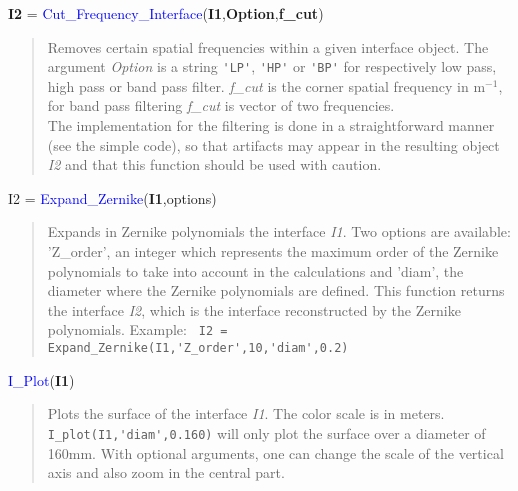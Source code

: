 \noindent \textbf{I2} = \textcolor{blue}{Cut\_Frequency\_Interface}(\textbf{I1},\textbf{Option},\textbf{f\_cut})
\vspace*{-0.2cm}
\begin{quote}
Removes certain spatial frequencies within a given interface object. The argument \textsl{Option} is a string \verb?'LP'?, \verb?'HP'? or \verb?'BP'? for respectively low pass, high pass or band pass filter. \textsl{f\_cut} is the corner spatial frequency in m$^{-1}$, for band pass filtering \textsl{f\_cut} is vector of two frequencies.\\
The implementation for the filtering is done in a straightforward manner (see the simple code), so that artifacts may appear in the resulting object \textsl{I2} and that this function should be used with caution.
\end{quote}


\noindent I2 = \textcolor{blue}{Expand\_Zernike}(\textbf{I1},options)
\vspace*{-0.2cm}
\begin{quote}
Expands in Zernike polynomials the interface \textsl{I1}. Two options are available: 'Z\_order', an integer which represents the maximum order of the Zernike polynomials to take into account in the calculations and 'diam', the diameter where the Zernike polynomials are defined. This function returns the interface \textsl{I2}, which is the interface reconstructed by the Zernike polynomials. Example:
\verb? I2 = Expand_Zernike(I1,'Z_order',10,'diam',0.2) ?
\end{quote}


\noindent \textcolor{blue}{I\_Plot}(\textbf{I1})
\vspace*{-0.2cm}
\begin{quote}
Plots the surface of the interface \textsl{I1}. The color scale is in meters. \verb? I_plot(I1,'diam',0.160)? will only plot the surface over a diameter of 160mm. With optional arguments, one can change the scale of the vertical axis and also zoom in the central part.
\end{quote}


